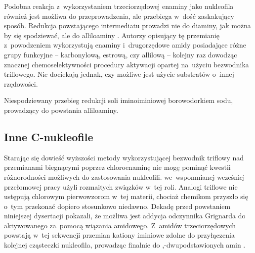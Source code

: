 Podobna reakcja z~wykorzystaniem trzeciorzędowej enaminy  jako nukleofila również jest możliwa do przeprowadzenia,
  ale przebiega w~dość zaskakujący sposób.
Redukcja powstającego intermediatu  prowadzi nie do diaminy,
  jak można by się spodziewać, ale do alliloaminy .
Autorzy opisujący tę przemianię z~powodzeniem wykorzystują enaminy i~drugorzędowe amidy posiadające różne grupy funkcyjne \---
  karbonylową, estrową, czy allilową \--- kolejny raz dowodząc znacznej chemoselektywności procedury aktywacji opartej na~użyciu bezwodnika triflowego.
Nie dociekają jednak, czy możliwe jest użycie substratów o~innej rzędowości.
\begin{scheme*}
  \centering
  
  \caption{
    Niespodziewany przebieg redukcji soli iminoiminiowej  borowodorkiem sodu,
    prowadzący do powstania alliloaminy.
  }
  \label{sch:allyloamine-synthesis}
\end{scheme*}

\subsection{Inne C-nukleofile}\label{literature:triflic:c-nucleophiles}
Starając się dowieść wyższości metody wykorzystującej bezwodnik triflowy nad przemianami biegnącymi
  poprzez chloroenaminę nie mogę pominąć kwestii różnorodności możliwych do zastosowania nukleofili.
\citeauthor{ghosez69} we~wspomnianej wcześniej przełomowej pracy użyli rozmaitych związków w~tej roli.
Analogi triflowe nie ustępują chlorowym pierwowzorom w~tej materii,
  chociaż chemikom przyszło się o~tym przekonać dopiero stosunkowo niedawno.
Dekadę przed powstaniem niniejszej dysertacji \citeauthor{xiao10} pokazali,
  że możliwa jest addycja odczynnika Grignarda do aktywowanego za~pomocą  wiązania amidowego.
Z~amidów trzeciorzędowych  powstają w~tej sekwencji przemian kationy iminiowe
   zdolne do przyłączenia kolejnej cząsteczki nukleofila,
  prowadząc finalnie do \textalpha,\textalpha-dwupodstawionych amin .

